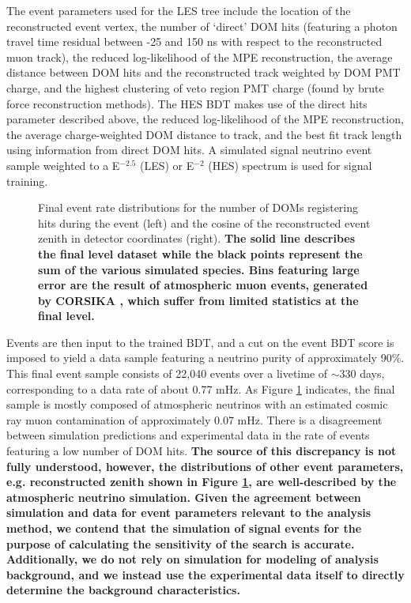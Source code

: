 \documentclass[manuscript]{aastex}
\begin{document}
The event parameters used for the LES tree include the location of the reconstructed event vertex, the number of `direct' DOM hits (featuring a photon travel time residual between -25 and 150 ns with respect to the reconstructed muon track), the reduced log-likelihood of the MPE reconstruction, the average distance between DOM hits and the reconstructed track weighted by DOM PMT charge, and the highest clustering of veto region PMT charge (found by brute force reconstruction methods). The HES BDT makes use of the direct hits parameter described above, the reduced log-likelihood of the MPE reconstruction, the average charge-weighted DOM distance to track, and the best fit track length using information from direct DOM hits. A simulated signal neutrino event sample weighted to a E$^{-2.5}$ (LES) or E$^{-2}$ (HES) spectrum is used for signal training.
\begin{figure}[ht]
\caption[Final Sample Event Parameter Distributions]{Final event rate distributions for the number of DOMs registering hits during the event (left) and the cosine of the reconstructed event zenith in detector coordinates (right). \textbf{The solid line describes the final level dataset while the black points represent the sum of the various simulated species. Bins featuring large error are the result of atmospheric muon events, generated by CORSIKA \citep{1998cmcc.book.....H}, which suffer from limited statistics at the final level.}}
\label{fig:PostBDTDistributions}
\end{figure}

Events are then input to the trained BDT, and a cut on the event BDT score is imposed to yield a data sample featuring a neutrino purity of approximately 90$\%$. This final event sample consists of 22,040 events over a livetime of $\sim$330 days, corresponding to a data rate of about 0.77 mHz. As Figure \ref{fig:PostBDTDistributions} indicates, the final sample is mostly composed of atmospheric neutrinos with an estimated cosmic ray muon contamination of approximately 0.07 mHz. There is a disagreement between simulation predictions and experimental data in the rate of events featuring a low number of DOM hits. \textbf{The source of this discrepancy is not fully understood, however, the distributions of other event parameters, e.g. reconstructed zenith shown in Figure \ref{fig:PostBDTDistributions}, are well-described by the atmospheric neutrino simulation. Given the agreement between simulation and data for event parameters relevant to the analysis method, we contend that the simulation of signal events for the purpose of calculating the sensitivity of the search is accurate. Additionally, we do not rely on simulation for modeling of analysis background, and we instead use the experimental data itself to directly determine the background characteristics.}
\end{document}
